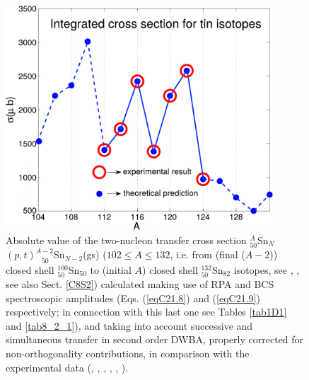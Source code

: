   \begin{figure}
  \centerline{\includegraphics*[width=10cm,angle=0]{nutshell/figs/cross_strength.pdf}}
  \caption[Two-nucleon transfer cross section $^A_{50}$Sn$_{N}$$(p,t)^{A-2}_{\;\;\;50}$Sn$_{N-2}$(gs).]{ Absolute value of the  two-nucleon transfer cross section $^A_{50}$Sn$_{N}$$(p,t)^{A-2}_{\;\;\;50}$Sn$_{N-2}$(gs) ($102\leq A\leq 132$, i.e. from (final ($A-2$)) closed shell $^{100}_{50}$Sn$_{50}$ to (initial $A$) closed shell $^{132}_{50}$Sn$_{82}$ isotopes, see   \cite{Potel:13}, \cite{Potel:13b}, see also Sect. \ref{C8S2}) calculated making use of RPA and BCS spectroscopic amplitudes (Eqs. (\ref{eqC21.8}) and (\ref{eqC21.9}) respectively; in connection with this last one see Tables \ref{tab1D1} and \ref{tab8_2_1}), and taking into account successive and simultaneous transfer in second order DWBA, properly corrected for non-orthogonality contributions, in comparison with the experimental data (\cite{Guazzoni:99}, \cite{Guazzoni:04}, \cite{Guazzoni:06}, \cite{Guazzoni:08}, \cite{Guazzoni:11}, \cite{Guazzoni:12}). 
  }\label{fig1.5}
  \end{figure}
\FloatBarrier




